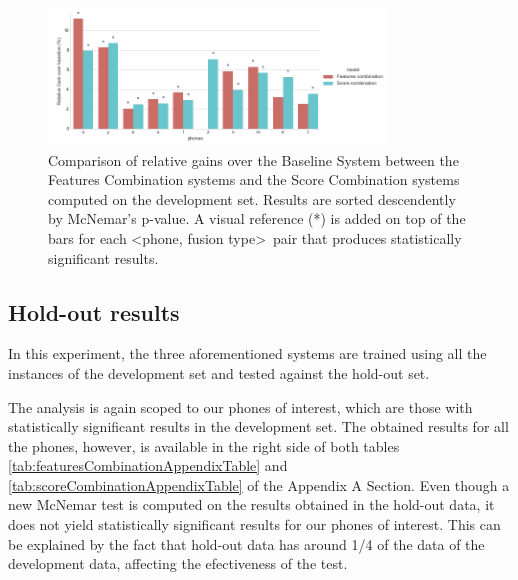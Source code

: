 \begin{figure}[H]
	\centering
	\includegraphics[width=0.8\textwidth]{files/figures/results/relatives/relatives-fusion-systems-dev-mcnemar.png}
	\caption{Comparison of relative gains over the Baseline System
	between the Features Combination systems
	and the Score Combination systems
	computed on the development set. Results are sorted descendently by McNemar's p-value.
	A visual reference (*) is added on top of the bars
	for each \textless phone, fusion type\textgreater \ pair that produces
	statistically significant results.}

	\label{fig:fusionMcnemarDev}
\end{figure}

\subsection{Hold-out results}

In this experiment, the three aforementioned systems are trained using all the instances of the
development set and tested against the hold-out set.

The analysis is again scoped to our phones of interest, which are those with statistically
significant results in the development set.
The obtained results for all the phones, however, is available
in the right side of both tables
\ref{tab:featuresCombinationAppendixTable} and \ref{tab:scoreCombinationAppendixTable}
of the Appendix A Section.
Even though a new McNemar test is computed on the
results obtained in the hold-out data, it does not yield statistically significant results
for our phones of interest. This can be explained by the fact that hold-out data
has around 1/4 of the data of the
development data, affecting the efectiveness of the test.


